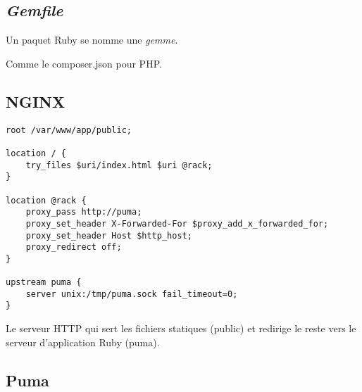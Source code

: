 \hypertarget{gemfile}{%
\subsection{\texorpdfstring{\emph{Gemfile}}{Gemfile}}\label{gemfile}}

Un paquet Ruby se nomme une \emph{gemme}.

\begin{otherlanguage}{english}

\begin{Shaded}
\begin{Highlighting}[]

\NormalTok{, }
\end{Highlighting}
\end{Shaded}

\end{otherlanguage}

Comme le composer.json pour PHP.

\hypertarget{nginx}{%
\subsection{NGINX}\label{nginx}}

\begin{otherlanguage}{english}

\begin{verbatim}
root /var/www/app/public;

location / {
    try_files $uri/index.html $uri @rack;
}

location @rack {
    proxy_pass http://puma;
    proxy_set_header X-Forwarded-For $proxy_add_x_forwarded_for;
    proxy_set_header Host $http_host;
    proxy_redirect off;
}

upstream puma {
    server unix:/tmp/puma.sock fail_timeout=0;
}
\end{verbatim}

\end{otherlanguage}

Le serveur HTTP qui sert les fichiers statiques (public) et redirige le
reste vers le serveur d'application Ruby (puma).

\hypertarget{puma}{%
\subsection{Puma}\label{puma}}

